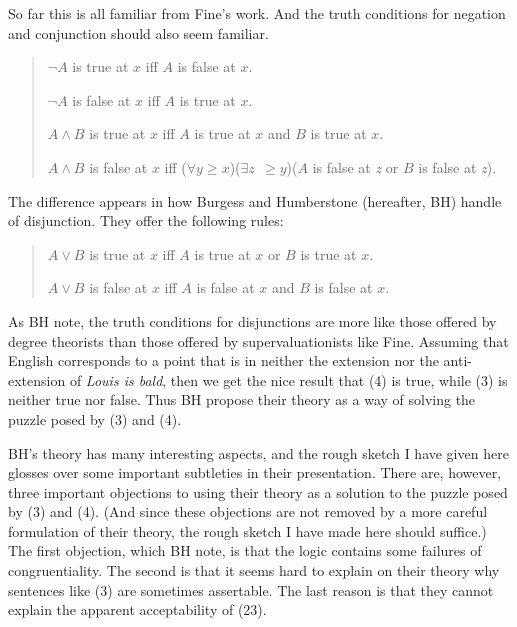 \noindent So far this is all familiar from Fine's work. And the truth conditions for negation and conjunction should also seem familiar.

\begin{quote}
\(\neg A\) is true at \(x\) iff \(A\) is false at \(x\).

\(\neg A\) is false at \(x\) iff \(A\) is true at \(x\).

\(A \wedge B\) is true at \(x\) iff \(A\) is true at \(x\) and \(B\) is true at \(x\).

\(A \wedge B\) is false at \(x\) iff (\(\forall y \geq x\))(\(\exists\)\textit{z}~\(\geq y\))(\(A\) is false at \textit{z} or \(B\) is false at \textit{z}).
\end{quote}

\noindent The difference appears in how Burgess and Humberstone (hereafter, BH) handle of disjunction. They offer the following rules:

\begin{quote}
\(A \vee B\) is true at \(x\) iff \(A\) is true at \(x\) or \(B\) is true at \(x\).

\(A \vee B\) is false at \(x\) iff \(A\) is false at \(x\) and \(B\) is false at \(x\).
\end{quote}

\noindent As BH note, the truth conditions for disjunctions are more like those offered by degree theorists than those offered by supervaluationists like Fine. Assuming that English corresponds to a point that is in neither the extension nor the anti-extension of \textit{Louis is bald}, then we get the nice result that (4) is true, while (3) is neither true nor false. Thus BH propose their theory as a way of solving the puzzle posed by (3) and (4).

BH's theory has many interesting aspects, and the rough sketch I have given here glosses over some important subtleties in their presentation. There are, however, three important objections to using their theory as a solution to the puzzle posed by (3) and (4). (And since these objections are not removed by a more careful formulation of their theory, the rough sketch I have made here should suffice.) The first objection, which BH note, is that the logic contains some failures of congruentiality. The second is that it seems hard to explain on their theory why sentences like (3) are sometimes assertable. The last reason is that they cannot explain the apparent acceptability of (23).

